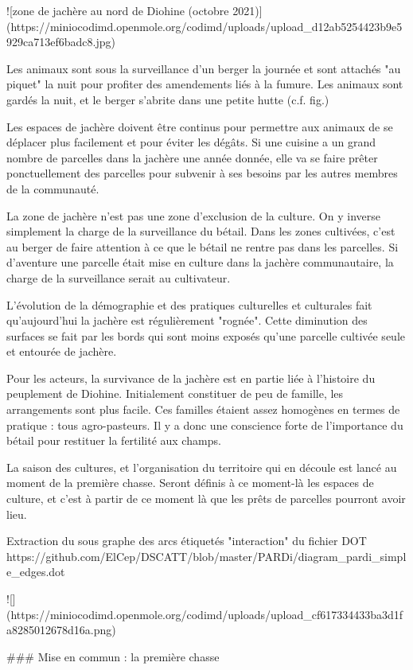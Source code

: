 ![zone de jachère au nord de Diohine (octobre 2021)](https://miniocodimd.openmole.org/codimd/uploads/upload_d12ab5254423b9e5929ca713ef6badc8.jpg)

Les animaux sont  sous la surveillance d'un berger la journée et sont attachés "au piquet" la nuit pour profiter des amendements liés à la fumure. Les animaux sont gardés la nuit, et le berger s'abrite dans une petite hutte (c.f. fig.)

Les espaces de jachère doivent être continus pour permettre aux animaux de se déplacer plus facilement et pour éviter les dégâts. Si une cuisine a un grand nombre de parcelles dans la jachère une année donnée, elle va se faire prêter ponctuellement des parcelles pour subvenir à ses besoins par les autres membres de la communauté. 

La zone de jachère n'est pas une zone d'exclusion de la culture. On y inverse simplement la charge de la surveillance du bétail. Dans les zones cultivées, c'est au berger de faire attention à ce que le bétail ne rentre pas dans les parcelles. Si d'aventure une parcelle était mise en culture dans la jachère communautaire, la charge de la surveillance serait au cultivateur. 

L'évolution de la démographie et des pratiques culturelles et culturales fait qu'aujourd'hui la jachère est régulièrement "rognée". Cette diminution des surfaces se fait par les bords qui sont moins exposés qu'une parcelle cultivée seule et entourée de jachère. 

Pour les acteurs, la survivance de la jachère est en partie liée à l'histoire du peuplement de Diohine. Initialement constituer de peu de famille, les arrangements sont plus facile. Ces familles étaient assez homogènes en termes de pratique : tous agro-pasteurs. Il y a donc une conscience forte de l'importance du bétail pour restituer la fertilité aux champs. 

La saison des cultures, et l'organisation du territoire qui en découle est lancé au moment de la première chasse. Seront définis à ce moment-là les espaces de culture, et c'est à partir de ce moment là que les prêts de parcelles pourront avoir lieu.

Extraction du sous graphe des arcs étiquetés  "interaction" du fichier DOT https://github.com/ElCep/DSCATT/blob/master/PARDi/diagram_pardi_simple_edges.dot 
 
![](https://miniocodimd.openmole.org/codimd/uploads/upload_cf617334433ba3d1fa8285012678d16a.png)
 
 ### Mise en commun : la première chasse
 
